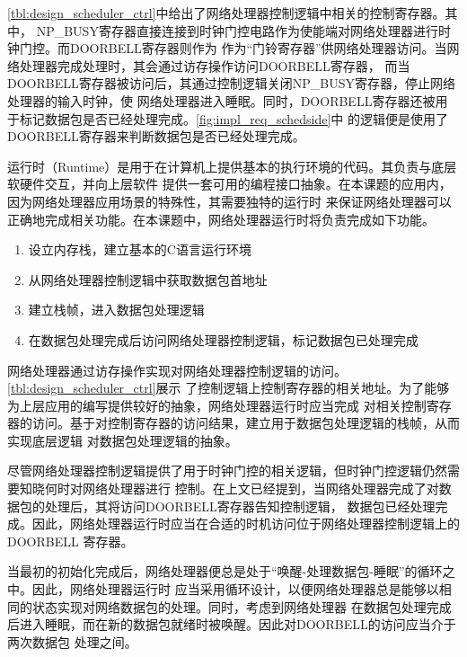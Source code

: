 \autoref{tbl:design_scheduler_ctrl}中给出了网络处理器控制逻辑中相关的控制寄存器。其中，
NP\_BUSY寄存器直接连接到时钟门控电路作为使能端对网络处理器进行时钟门控。而DOORBELL寄存器则作为
作为“门铃寄存器”供网络处理器访问。当网络处理器完成处理时，其会通过访存操作访问DOORBELL寄存器，
而当DOORBELL寄存器被访问后，其通过控制逻辑关闭NP\_BUSY寄存器，停止网络处理器的输入时钟，使
网络处理器进入睡眠。同时，DOORBELL寄存器还被用于标记数据包是否已经处理完成。\autoref{fig:impl_req_schedside}中
的逻辑便是使用了DOORBELL寄存器来判断数据包是否已经处理完成。


运行时（Runtime）是用于在计算机上提供基本的执行环境的代码。其负责与底层软硬件交互，并向上层软件
提供一套可用的编程接口抽象。在本课题的应用内，因为网络处理器应用场景的特殊性，其需要独特的运行时
来保证网络处理器可以正确地完成相关功能。在本课题中，网络处理器运行时将负责完成如下功能。

\begin{enumerate}
  \item 设立内存栈，建立基本的C语言运行环境
  \item 从网络处理器控制逻辑中获取数据包首地址
  \item 建立栈帧，进入数据包处理逻辑
  \item 在数据包处理完成后访问网络处理器控制逻辑，标记数据包已处理完成
\end{enumerate}

网络处理器通过访存操作实现对网络处理器控制逻辑的访问。\autoref{tbl:design_scheduler_ctrl}展示
了控制逻辑上控制寄存器的相关地址。为了能够为上层应用的编写提供较好的抽象，网络处理器运行时应当完成
对相关控制寄存器的访问。基于对控制寄存器的访问结果，建立用于数据包处理逻辑的栈帧，从而实现底层逻辑
对数据包处理逻辑的抽象。

尽管网络处理器控制逻辑提供了用于时钟门控的相关逻辑，但时钟门控逻辑仍然需要知晓何时对网络处理器进行
控制。在上文已经提到，当网络处理器完成了对数据包的处理后，其将访问DOORBELL寄存器告知控制逻辑，
数据包已经处理完成。因此，网络处理器运行时应当在合适的时机访问位于网络处理器控制逻辑上的DOORBELL
寄存器。


当最初的初始化完成后，网络处理器便总是处于“唤醒-处理数据包-睡眠”的循环之中。因此，网络处理器运行时
应当采用循环设计，以便网络处理器总是能够以相同的状态实现对网络数据包的处理。同时，考虑到网络处理器
在数据包处理完成后进入睡眠，而在新的数据包就绪时被唤醒。因此对DOORBELL的访问应当介于两次数据包
处理之间。


